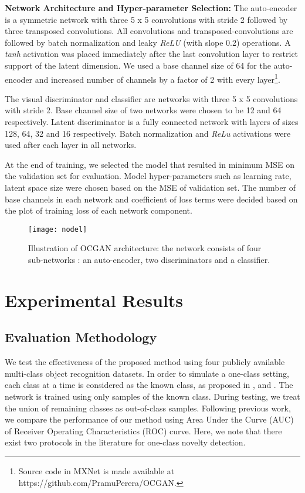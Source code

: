 \documentclass[10pt,twocolumn,letterpaper]{article}
\begin{document}
\noindent \textbf{Network Architecture and Hyper-parameter Selection:} The auto-encoder is a symmetric network with three 5 x 5 convolutions with stride 2 followed by three transposed convolutions. All convolutions and transposed-convolutions are followed by batch normalization and leaky {\it ReLU} (with slope 0.2) operations. A {\it tanh} activation was placed immediately after the last convolution layer to restrict support of the latent dimension. We used a base channel size of 64 for the auto-encoder and increased number of channels by a factor of 2 with every layer\footnote{Source code in MXNet is made available at https://github.com/PramuPerera/OCGAN.}. 

The visual discriminator and classifier are networks with three 5 x 5 convolutions with stride 2. Base channel size of two networks were chosen to be 12 and 64 respectively. Latent discriminator is a fully connected network with layers of sizes 128, 64, 32 and 16 respectively. Batch normalization and {\it ReLu} activations were used after each layer in all networks.

At the end of training, we selected the model that resulted in minimum MSE on the validation set for evaluation. Model hyper-parameters such as learning rate, latent space size were chosen based on the MSE of validation set. The number of base channels in each network and coefficient of loss terms were decided based on the plot of training loss of each network component.


\begin{figure*}
    \centering
\texttt{[image: nodel]}\hskip30pt
    \caption{Illustration of OCGAN architecture: the network consists of four sub-networks : an auto-encoder, two discriminators and a classifier. }
    \label{fig:model}
\end{figure*}



\section{Experimental Results}


\subsection{Evaluation Methodology}

We test the effectiveness of the proposed method using four publicly available multi-class object recognition datasets. In order to simulate a one-class setting, each class at a time is considered as the known class, as proposed in \cite{AND}, \cite{GPND} and \cite{dsvdd}. The network is trained using only samples of the known class. During testing, we treat the union of remaining classes as out-of-class samples. Following previous work, we compare the performance of our method using Area Under the Curve (AUC) of Receiver Operating Characteristics (ROC) curve. Here, we note that there exist two protocols in the literature for one-class novelty detection. 
\end{document}
